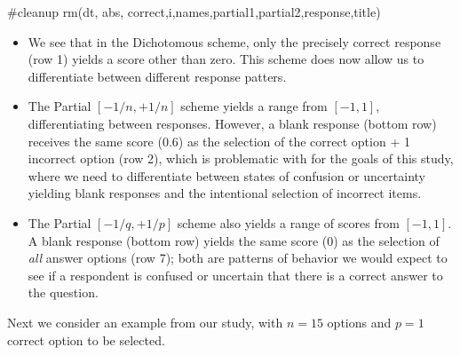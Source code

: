 \documentclass[
  letterpaper,
  DIV=11,
  numbers=noendperiod]{scrreprt}
\newenvironment{Shaded}{\begin{snugshade}}{\end{snugshade}}
\newcommand{\CommentTok}[1]{\textcolor[rgb]{0.37,0.37,0.37}{#1}}
\newcommand{\FunctionTok}[1]{\textcolor[rgb]{0.28,0.35,0.67}{#1}}
\newcommand{\NormalTok}[1]{\textcolor[rgb]{0.00,0.23,0.31}{#1}}
\begin{document}
\begin{Shaded}
\begin{Highlighting}[]
\CommentTok{\#cleanup}
\FunctionTok{rm}\NormalTok{(dt, abs, correct,i,names,partial1,partial2,response,title)}
\end{Highlighting}
\end{Shaded}

\begin{itemize}
\item
  We see that in the Dichotomous scheme, only the precisely correct
  response (row 1) yields a score other than zero. This scheme does now
  allow us to differentiate between different response patters.
\item
  The Partial \([-1/n, +1/n]\) scheme yields a range from \([-1,1]\),
  differentiating between responses. However, a blank response (bottom
  row) receives the same score (0.6) as the selection of the correct
  option + 1 incorrect option (row 2), which is problematic with for the
  goals of this study, where we need to differentiate between states of
  confusion or uncertainty yielding blank responses and the intentional
  selection of incorrect items.
\item
  The Partial \([-1/q, +1/p]\) scheme also yields a range of scores from
  \([-1,1]\). A blank response (bottom row) yields the same score
  (\(0\)) as the selection of \emph{all} answer options (row 7); both
  are patterns of behavior we would expect to see if a respondent is
  confused or uncertain that there is a correct answer to the question.
\end{itemize}

Next we consider an example from our study, with \(n = 15\) options and
\(p = 1\) correct option to be selected.
\end{document}
